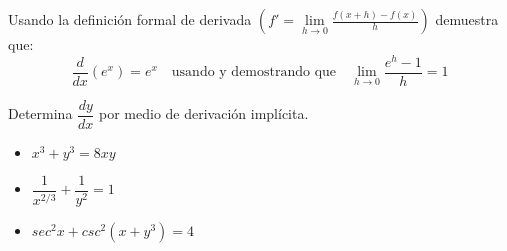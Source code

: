 \documentclass[10pt]{exam}
\begin{document}
\begin{questions}
\vskip15pt

    \question Usando la definición formal de derivada $\left(f'=\lim\limits_{h \to 0}\frac{f(x+h)-f(x)}{h}\right)$ demuestra que:
    $$\frac{d}{dx}(e^x)=e^x \quad \text{usando y demostrando que} \quad 
       \lim\limits_{h\to0}\frac{e^h-1}{h}=1$$
    




 \vskip20pt

    \question Determina $\dfrac{dy}{dx}$ por medio de derivación implícita.
    \begin{itemize}
        \item $x^3+y^3=8xy$
        \item $\dfrac{1}{x^{2/3}}+\dfrac{1}{y^2}=1$
        \item $sec^2 x+csc^2 (x+y^3)=4$
    \end{itemize}
    

\end{questions}
\end{document}
